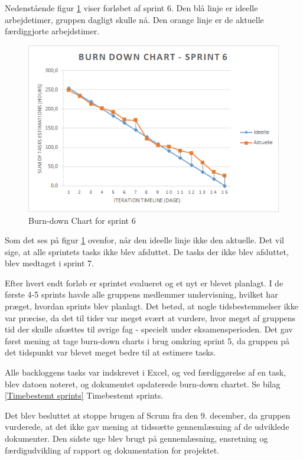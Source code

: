 Nedenstående figur \ref{Burn} viser forløbet af sprint 6. Den blå linje er ideelle arbejdetimer, gruppen dagligt skulle nå. Den orange linje er de aktuelle færdiggjorte arbejdstimer. 

\begin{figure}[H]
    \centering
    \includegraphics[width=1\textwidth]{figurer/d/Burn-down}
    \caption{Burn-down Chart for sprint 6}
    \label{Burn}
\end{figure}

Som det ses på figur \ref{Burn} ovenfor, når den ideelle linje ikke den aktuelle. Det vil sige, at alle sprintets tasks ikke blev afsluttet. De tasks der ikke blev afsluttet, blev medtaget i sprint 7. 

Efter hvert endt forløb er sprintet evalueret og et nyt er blevet planlagt. I de første 4-5 sprints havde alle gruppens medlemmer undervisning, hvilket har præget, hvordan sprints blev planlagt. Det betød, at nogle tidsbestemmelser ikke var præcise, da det til tider var meget svært at vurdere, hvor meget af gruppens tid der skulle afsættes til øvrige fag - specielt under eksamensperioden. Det gav først mening at tage burn-down charts i brug omkring sprint 5, da gruppen på det tidspunkt var blevet meget bedre til at estimere tasks.

Alle backloggens tasks var indskrevet i Excel, og ved færdiggørelse af en task, blev datoen noteret, og dokumentet opdaterede burn-down chartet. Se bilag \ref{Timebestemt sprints} Timebestemt sprints. 

Det blev besluttet at stoppe brugen af Scrum fra den 9. december, da gruppen vurderede, at det ikke gav mening at tidssætte gennemlæsning af de udviklede dokumenter. Den sidste uge blev brugt på gennemlæsning, ensretning og færdigudvikling af rapport og dokumentation for projektet.  

